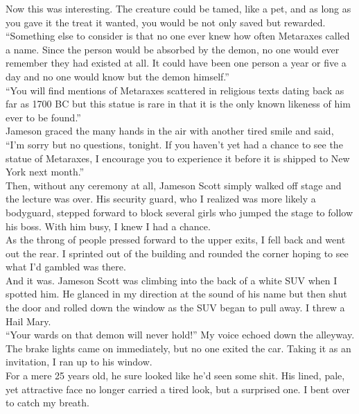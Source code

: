 \documentclass[a5paper]{scrartcl}
\begin{document}
Now this was interesting. The creature could be tamed, like a pet, and as long as you gave it the treat it wanted, you would be not only saved but rewarded. \\


\enquote{Something else to consider is that no one ever knew how often Metaraxes called a name. Since the person would be absorbed by the demon, no one would ever remember they had existed at all. It could have been one person a year or five a day and no one would know but the demon himself.}\\


\enquote{You will find mentions of Metaraxes scattered in religious texts dating back as far as 1700 BC but this statue is rare in that it is the only known likeness of him ever to be found.}\\


Jameson graced the many hands in the air with another tired smile and said, \enquote{I'm sorry but no questions, tonight. If you haven't yet had a chance to see the statue of Metaraxes, I encourage you to experience it before it is shipped to New York next month.}\\


Then, without any ceremony at all, Jameson Scott simply walked off stage and the lecture was over.  His security guard, who I realized was more likely a bodyguard, stepped forward to block several girls who jumped the stage to follow his boss. With him busy, I knew I had a chance.\\


As the throng of people pressed forward to the upper exits, I fell back and went out the rear. I sprinted out of the building and rounded the corner hoping to see what I'd gambled was there.\\


And it was. Jameson Scott was climbing into the back of a white SUV when I spotted him. He glanced in my direction at the sound of his name but then shut the door and rolled down the window as the SUV began to pull away. I threw a Hail Mary.\\


\enquote{Your wards on that demon will never hold!} My voice echoed down the alleyway.\\


The brake lights came on immediately, but no one exited the car. Taking it as an invitation, I ran up to his window.\\


For a mere 25 years old, he sure looked like he'd seen some shit. His lined, pale, yet attractive face no longer carried a tired look, but a surprised one. I bent over to catch my breath.\\
\end{document}
